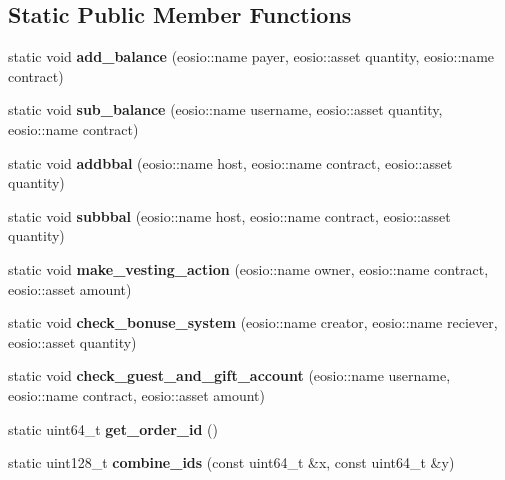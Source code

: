 \subsection*{Static Public Member Functions}
\begin{DoxyCompactItemize}
\item 
\mbox{\label{classp2p_ac36f6042dcb8942679dddbf672684ddc}} 
static void {\bfseries add\+\_\+balance} (eosio\+::name payer, eosio\+::asset quantity, eosio\+::name contract)
\item 
\mbox{\label{classp2p_afc44fa7dedaeea9559af5f70445b5218}} 
static void {\bfseries sub\+\_\+balance} (eosio\+::name username, eosio\+::asset quantity, eosio\+::name contract)
\item 
\mbox{\label{classp2p_aa6f449f9ebec47b6741ed3497a3b92f9}} 
static void {\bfseries addbbal} (eosio\+::name host, eosio\+::name contract, eosio\+::asset quantity)
\item 
\mbox{\label{classp2p_a9bbb48f7000e2ad2c901fe04f3e7f024}} 
static void {\bfseries subbbal} (eosio\+::name host, eosio\+::name contract, eosio\+::asset quantity)
\item 
\mbox{\label{classp2p_a0b427c0584a5dd22a924273d3476dfd7}} 
static void {\bfseries make\+\_\+vesting\+\_\+action} (eosio\+::name owner, eosio\+::name contract, eosio\+::asset amount)
\item 
\mbox{\label{classp2p_ac62758f88566e5dafc0804182f324658}} 
static void {\bfseries check\+\_\+bonuse\+\_\+system} (eosio\+::name creator, eosio\+::name reciever, eosio\+::asset quantity)
\item 
\mbox{\label{classp2p_a5a20e06fb911402d5e343389bdf944d4}} 
static void {\bfseries check\+\_\+guest\+\_\+and\+\_\+gift\+\_\+account} (eosio\+::name username, eosio\+::name contract, eosio\+::asset amount)
\item 
\mbox{\label{classp2p_a6277838ad086e92577864a4c59ec3e6c}} 
static uint64\+\_\+t {\bfseries get\+\_\+order\+\_\+id} ()
\item 
\mbox{\label{classp2p_a4aa15958215b4647e9adc4ed3d53af8c}} 
static uint128\+\_\+t {\bfseries combine\+\_\+ids} (const uint64\+\_\+t \&x, const uint64\+\_\+t \&y)
\end{DoxyCompactItemize}
